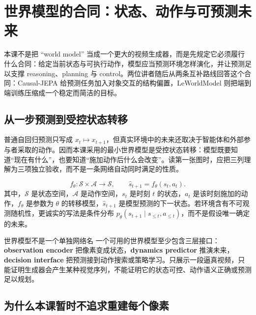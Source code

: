 \section{世界模型的合同：状态、动作与可预测未来}

本课不是把 ``world model'' 当成一个更大的视频生成器，而是先规定它必须履行什么合同：给定当前状态与可执行动作，模型应当预测环境怎样演化，并让预测足以支撑 reasoning、planning 与 control。两位讲者随后从两条互补路线回答这个合同：Causal-JEPA 给预测任务加入对象交互的结构偏置，LeWorldModel 则把端到端训练压缩成一个稳定而简洁的目标。

\subsection{从一步预测到受控状态转移}

普通自回归预测只写成 $x_t\mapsto x_{t+1}$，但真实环境中的未来还取决于智能体和外部参与者采取的动作。因而本课采用的最小世界模型是受控状态转移：模型既要知道``现在有什么''，也要知道``施加动作后什么会改变''。读第一张图时，应把三列理解为三项独立验收，而不是一条网络自动同时满足的性质。


\[
f_\theta:\mathcal{S}\times\mathcal{A}\rightarrow\mathcal{S},
\qquad
\hat{s}_{t+1}=f_\theta(s_t,a_t).
\]
其中，$\mathcal{S}$ 是状态空间，$\mathcal{A}$ 是动作空间，$s_t$ 是时刻 $t$ 的状态，$a_t$ 是该时刻施加的动作，$f_\theta$ 是参数为 $\theta$ 的转移模型，$\hat{s}_{t+1}$ 是模型预测的下一状态。若环境含有不可观测随机性，更诚实的写法是条件分布 $p_\theta(s_{t+1}\mid s_{\le t},a_{\le t})$，而不是假设唯一确定的未来。


\begin{importantbox}{世界模型不是一个单独网络名}
一个可用的世界模型至少包含三层接口：\textbf{observation encoder} 把像素变成状态，\textbf{dynamics predictor} 推演未来，\textbf{decision interface} 把预测接到动作搜索或策略学习。只展示一段逼真视频，只能证明生成器会产生某种视觉序列，不能证明它的状态可控、动作语义正确或预测足以规划。
\end{importantbox}

\subsection{为什么本课暂时不追求重建每个像素}

